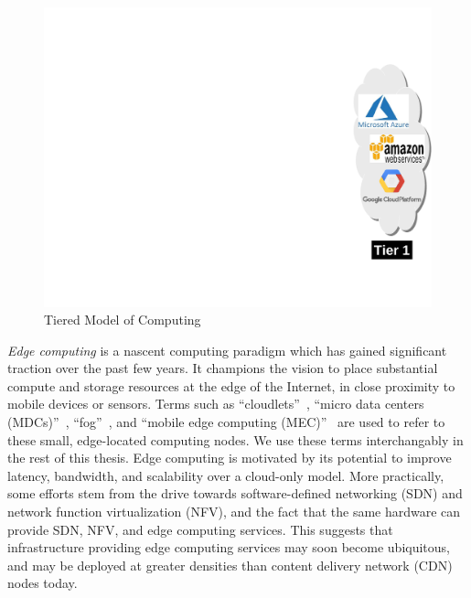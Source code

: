 \begin{figure}[t]
\begin{minipage}[b]{4.3in}
\begin{minipage}[c]{1.75in}
\end{minipage}
\begin{minipage}[c]{0.55in}
\includegraphics[scale=0.33]{FIGS/fig-3tier-C.pdf}
\end{minipage}
\caption{\small Tiered Model of Computing}
\label{fig:3tier}
\end{minipage}
\end{figure}

{\em Edge computing} is a nascent computing paradigm which has gained
significant traction over the past few years. It champions the vision to place
substantial compute and storage resources at the edge of the Internet, in close
proximity to mobile devices or sensors.  Terms such as
``cloudlets''~\cite{Satya2009}, ``micro data centers (MDCs)''~\cite{Greene2012},
``fog''~\cite{Bonomi2012}, and ``mobile edge computing (MEC)''~\cite{Brown2013}
are used to refer to these small, edge-located computing nodes.  We use these
terms interchangably in the rest of this thesis. Edge computing is motivated by
its potential to improve latency, bandwidth, and scalability over a cloud-only
model.  More practically, some efforts stem from the drive towards
software-defined networking (SDN) and network function virtualization (NFV), and
the fact that the same hardware can provide SDN, NFV, and edge computing
services. This suggests that infrastructure providing edge computing services
may soon become ubiquitous, and may be deployed at greater densities than
content delivery network (CDN) nodes today. 


